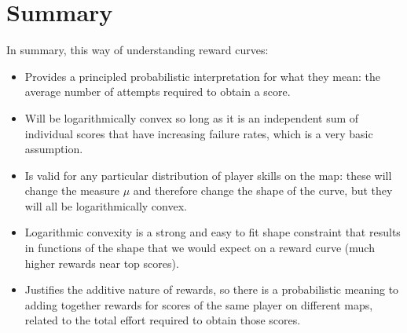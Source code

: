 \documentclass[12pt,a4paper]{article}
\begin{document}
\section{Summary}

In summary, this way of understanding reward curves:

\begin{itemize}
\item Provides a principled probabilistic interpretation for what they mean: the average number of attempts required to obtain a score.
\item Will be logarithmically convex so long as it is an independent sum of individual scores that have increasing failure rates, which is a very basic assumption.
\item Is valid for any particular distribution of player skills on the map: these will change the measure $\mu$ and therefore change the shape of the curve, but they will all be logarithmically convex.
\item Logarithmic convexity is a strong and easy to fit shape constraint that results in functions of the shape that we would expect on a reward curve (much higher rewards near top scores).
\item Justifies the additive nature of rewards, so there is a probabilistic meaning to adding together rewards for scores of the same player on different maps, related to the total effort required to obtain those scores.
\end{itemize}

\dobibliography
\end{document}
